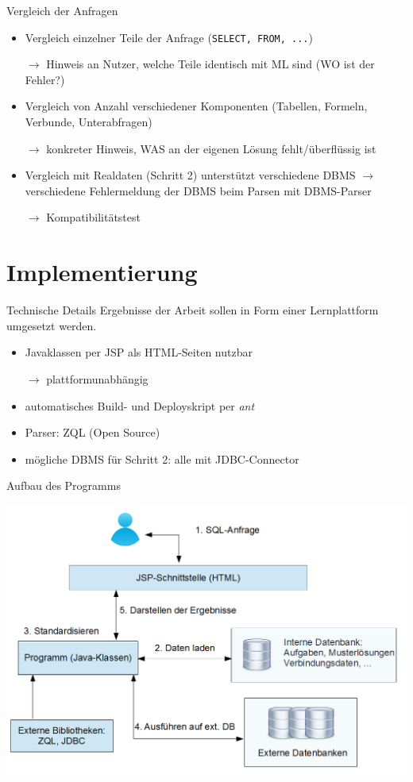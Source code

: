 \documentclass{beamer}
\begin{document}
\begin{frame}[fragile]{Vergleich der Anfragen}
\begin{itemize}
\item Vergleich einzelner Teile der Anfrage (\verb|SELECT, FROM, ...|)
\item[$\to$] Hinweis an Nutzer, welche Teile identisch mit ML sind (WO ist der Fehler?)
\item Vergleich von Anzahl verschiedener Komponenten (Tabellen, Formeln, Verbunde, Unterabfragen)
\item[$\to$] konkreter Hinweis, WAS an der eigenen Lösung fehlt/überflüssig ist
\item Vergleich mit Realdaten (Schritt 2) unterstützt verschiedene DBMS $\to$ verschiedene Fehlermeldung der DBMS beim Parsen mit DBMS-Parser
\item[$\to$] Kompatibilitätstest 
\end{itemize}
\end{frame}


\section{Implementierung}


\begin{frame}[fragile]{Technische Details}
Ergebnisse der Arbeit sollen in Form einer Lernplattform umgesetzt werden.
\vspace{5mm}
\begin{itemize}
\item Javaklassen per JSP als HTML-Seiten nutzbar
\item[$\to$] plattformunabhängig
\item automatisches Build- und Deployskript per \textit{ant}
\item Parser: ZQL (Open Source)
\item mögliche DBMS für Schritt 2: alle mit JDBC-Connector 
\end{itemize}
\end{frame}

\begin{frame}[fragile]{Aufbau des Programms}
\begin{center}
\includegraphics[scale=0.4]{schema.png}
\end{center}
\end{frame}
\end{document}
